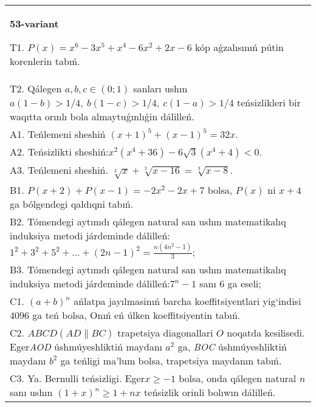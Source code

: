 \documentclass{article}
\begin{document}
\begin{tabular}{m{17cm}}
\textbf{53-variant}
\newline

T1. \(P(x) = x^{6} - 3x^{5} + x^{4} - 6x^{2} + 2x - 6\) kóp aǵzalısınıń pútin korenlerin tabıń. \\
T2. Qálegen \(a,b,c \in (0;1)\) sanları ushın \(a(1 - b) > 1/4,\ b(1 - c) > 1/4,\ c(1 - a) > 1/4\) teńsizlikleri bir waqıtta orınlı bola almaytuǵınlıǵin dálilleń. \\
A1. Teńlemeni sheshiń \((x + 1)^{5} + (x - 1)^{5} = 32x\). \\
A2. Teńsizlikti sheshiń:\(x^{2}\left( x^{4} + 36 \right) - 6\sqrt{3}\left( x^{4} + 4 \right) < 0\). \\
A3. Teńlemeni sheshiń. \(\sqrt[3]{x} + \sqrt[3]{x - 16} = \sqrt[3]{x - 8}\). \\
B1. \(P(x + 2) + P(x - 1) = - 2x^{2} - 2x + 7\) bolsa, \(P(x)\) ni \(x + 4\) ga bólgendegi qaldıqni tabıń. \\
B2. Tómendegi aytımdı qálegen natural san ushın matematikalıq induksiya metodi járdeminde dálilleń: \(1^{2} + 3^{2} + 5^{2} + ... + (2n - 1)^{2} = \frac{n\left( 4n^{2} - 1 \right)}{3}\); \\
B3. Tómendegi aytımdı qálegen natural san ushın matematikalıq induksiya metodi járdeminde dálilleń:\(7^{n} - 1\) sanı 6 ga eseli; \\
C1. \((a + b)^{n}\) ańlatpa jayılmasinıń barcha koeffitsiyentlari yig`indisi 4096 ga teń bolsa, Onıń eń úlken koeffitsiyentin tabıń. \\
C2. \(ABCD(AD\| BC)\) trapetsiya diagonallari \(O\) noqatda kesilisedi. Eger\emph{AOD} úshmúyeshliktiń maydanı \(a^{2}\) ga, \emph{BOC} úshmúyeshliktiń maydanı \(b^{2}\) ga teńligi ma'lum bolsa, trapetsiya maydanın tabıń. \\
C3. Ya. Bernulli teńsizligi. Eger\(x \geq - 1\) bolsa, onda qálegen natural \(n\) sanı ushın \((1 + x)^{n} \geq 1 + nx\) teńsizlik orinli bolıwın dálilleń. \\

\end{tabular}
\vspace{1cm}
\end{document}
